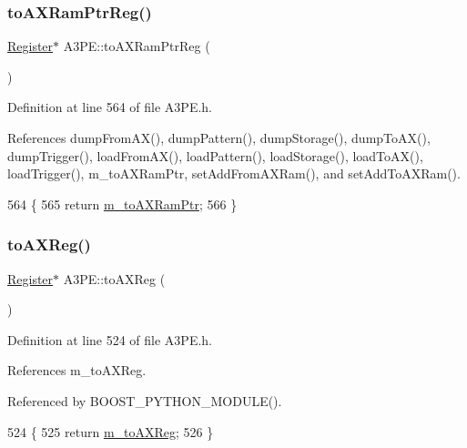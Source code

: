 \subsubsection{\texorpdfstring{to\+A\+X\+Ram\+Ptr\+Reg()}{toAXRamPtrReg()}}
{\footnotesize\ttfamily \hyperlink{classRegister}{Register}$\ast$ A3\+P\+E\+::to\+A\+X\+Ram\+Ptr\+Reg (\begin{DoxyParamCaption}{ }\end{DoxyParamCaption})\hspace{0.3cm}{\ttfamily [inline]}}



Definition at line 564 of file A3\+P\+E.\+h.



References dump\+From\+A\+X(), dump\+Pattern(), dump\+Storage(), dump\+To\+A\+X(), dump\+Trigger(), load\+From\+A\+X(), load\+Pattern(), load\+Storage(), load\+To\+A\+X(), load\+Trigger(), m\+\_\+to\+A\+X\+Ram\+Ptr, set\+Add\+From\+A\+X\+Ram(), and set\+Add\+To\+A\+X\+Ram().


\begin{DoxyCode}
564                            \{
565     \textcolor{keywordflow}{return} \hyperlink{classA3PE_aae1b8b2e96bba94535bd4de766bd7e65}{m\_toAXRamPtr};
566   \}
\end{DoxyCode}
\mbox{\label{classA3PE_a43b0006fafa3aeae353abb2ac30e872c}} 
\subsubsection{\texorpdfstring{to\+A\+X\+Reg()}{toAXReg()}}
{\footnotesize\ttfamily \hyperlink{classRegister}{Register}$\ast$ A3\+P\+E\+::to\+A\+X\+Reg (\begin{DoxyParamCaption}{ }\end{DoxyParamCaption})\hspace{0.3cm}{\ttfamily [inline]}}



Definition at line 524 of file A3\+P\+E.\+h.



References m\+\_\+to\+A\+X\+Reg.



Referenced by B\+O\+O\+S\+T\+\_\+\+P\+Y\+T\+H\+O\+N\+\_\+\+M\+O\+D\+U\+L\+E().


\begin{DoxyCode}
524                      \{
525     \textcolor{keywordflow}{return} \hyperlink{classA3PE_abe8eb76e3c0d967403726143deb1b70f}{m\_toAXReg};
526   \}
\end{DoxyCode}
\mbox{\label{classA3PE_a75cd0377eb653ed22c4d258ab359f3d6}} 

